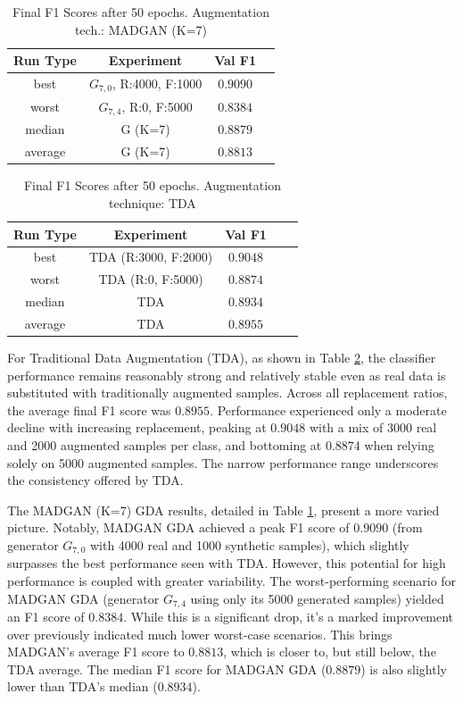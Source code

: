 \begin{table}[H]
	\vspace{-1.5em}
	\centering
	\begin{tabular}{|c|c|c|c|}
		\hline
		Run Type & Experiment & Val F1 \\ \hline
		best & \(G_{7, 0}\), R:4000, F:1000 & $0.9090$\\ \hline
		worst & \(G_{7, 4}\), R:0, F:5000 & $0.8384$\\ \hline
		median & G (K=7) & $0.8879$\\ \hline
		average & G (K=7) & $0.8813$
		\\ \hline
	\end{tabular}
    \caption{Final F1 Scores after 50 epochs. Augmentation tech.: MADGAN (K=7)}
        \label{tab:res_replacement_fashion_tda_vs_madgan__madgan}
\end{table}
\begin{table}[H]
	\centering
	\vspace{-1.5em}
	\begin{tabular}{|c|c|c|c|c|}
		\hline
		Run Type & Experiment & Val F1 \\ \hline
		best & TDA (R:3000, F:2000) & $0.9048$\\ \hline
		worst & TDA (R:0, F:5000) & $0.8874$\\ \hline
		median & TDA & $0.8934$\\ \hline
		average & TDA & $0.8955$
		\\ \hline
	\end{tabular}
    \caption{Final F1 Scores after 50 epochs. Augmentation technique: TDA}
        \label{tab:res_replacement_fashion_tda_vs_madgan__tda}
\end{table}

For Traditional Data Augmentation (TDA), as shown in Table \ref{tab:res_replacement_fashion_tda_vs_madgan__tda}, the classifier performance remains reasonably strong and relatively stable even as real data is substituted with traditionally augmented samples. Across all replacement ratios, the average final F1 score was $0.8955$. Performance experienced only a moderate decline with increasing replacement, peaking at $0.9048$ with a mix of 3000 real and 2000 augmented samples per class, and bottoming at $0.8874$ when relying solely on 5000 augmented samples. The narrow performance range underscores the consistency offered by TDA.

The MADGAN (K=7) GDA results, detailed in Table \ref{tab:res_replacement_fashion_tda_vs_madgan__madgan}, present a more varied picture. Notably, MADGAN GDA achieved a peak F1 score of $0.9090$ (from generator \(G_{7,0}\) with 4000 real and 1000 synthetic samples), which slightly surpasses the best performance seen with TDA. However, this potential for high performance is coupled with greater variability. The worst-performing scenario for MADGAN GDA (generator \(G_{7,4}\) using only its 5000 generated samples) yielded an F1 score of $0.8384$. While this is a significant drop, it's a marked improvement over previously indicated much lower worst-case scenarios. This brings MADGAN's average F1 score to $0.8813$, which is closer to, but still below, the TDA average. The median F1 score for MADGAN GDA ($0.8879$) is also slightly lower than TDA's median ($0.8934$).


